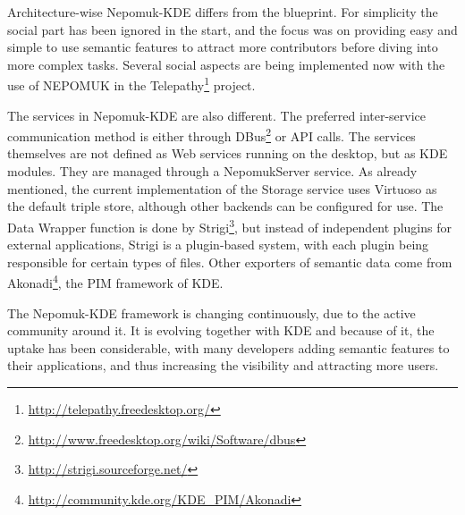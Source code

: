 Architecture-wise Nepomuk-KDE differs from the blueprint. For simplicity the social part has been ignored in the start, and the focus was on providing easy and simple to use semantic features to attract more contributors before diving into more complex tasks. Several social aspects are being implemented now with the use of NEPOMUK in the Telepathy\footnote{\url{http://telepathy.freedesktop.org/}} project.

The services in Nepomuk-KDE are also different. The preferred inter-service communication method is either through DBus\footnote{\url{http://www.freedesktop.org/wiki/Software/dbus}} or API calls. The services themselves are not defined as Web services running on the desktop, but as KDE modules. They are managed through a NepomukServer service.
As already mentioned, the current implementation of the Storage service uses Virtuoso as the default triple store, although other backends can be configured for use. 
The Data Wrapper function is done by Strigi\footnote{\url{http://strigi.sourceforge.net/}}, but instead of independent plugins for external applications, Strigi is a plugin-based system, with each plugin being responsible for certain types of files. Other exporters of semantic data come from Akonadi\footnote{\url{http://community.kde.org/KDE_PIM/Akonadi}}, the PIM framework of KDE.

The Nepomuk-KDE framework is changing continuously, due to the active community around it. It is evolving together with KDE and because of it, the uptake has been considerable, with many developers adding semantic features to their applications, and thus increasing the visibility and attracting more users.
